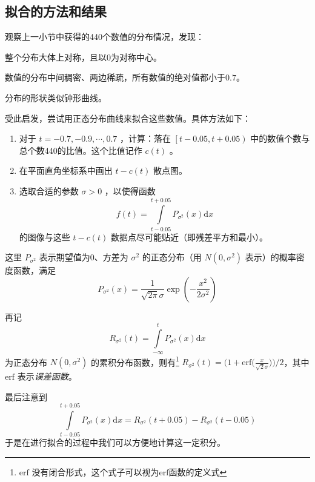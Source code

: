    \subsection{拟合的方法和结果}

        观察上一小节中获得的440个数值的分布情况，发现：
        \begin{asparaitem}
            \item 整个分布大体上对称，且以$0$为对称中心。
            \item 数值的分布中间稠密、两边稀疏，所有数值的绝对值都小于$0.7$。
            \item 分布的形状类似钟形曲线。
        \end{asparaitem}
        
        \vspace{1.5ex}

        受此启发，尝试用正态分布曲线来拟合这些数值。具体方法如下：
        \begin{enumerate}[leftmargin=6em]
            \item [\textbf{步骤 1.}] 对于 $t=-0.7,-0.9,\cdots,0.7$ ，计算：落在 $\left[t-0.05,t+0.05\right)$ 中的数值个数与总个数440的比值。这个比值记作 $c(t)$ 。
            \item [\textbf{步骤 2.}] 在平面直角坐标系中画出 $t-c(t)$ 散点图。
            \item [\textbf{步骤 3.}] 选取合适的参数 $\sigma>0$ ，以使得函数 $$ f(t)=\displaystyle\int\limits_{t-0.05}^{t+0.05} P_{\sigma^2}(x)\mathrm{d} x$$ 的图像与这些 $t-c(t)$ 数据点尽可能贴近（即残差平方和最小）。
        \end{enumerate}

        这里 $P_{\sigma^2}$ 表示期望值为0、方差为 $\sigma^2$ 的正态分布（用 $N(0,\sigma^2)$ 表示）的概率密度函数，满足 $$P_{\sigma^2}(x)=\frac{1}{\sqrt{2\pi}\sigma}\exp{\left(-\frac{x^2}{2\sigma^2}\right)}$$

        再记 $$R_{\sigma^2}(t)=\int\limits_{-\infty}^t P_{\sigma^2}(x)\mathrm{d}x$$ 为正态分布 $N(0,\sigma^2)$ 的累积分布函数，则有\footnote{$\mathrm{erf}$ 没有闭合形式，这个式子可以视为$\mathrm{erf}$函数的定义式} $R_{\sigma^2}(t)=\big(1+\mathrm{erf}\big(\frac x{\sqrt{2}\sigma}\big)\big)/2$\nobreak，其中 $\mathrm{erf}$ 表示\emph{误差函数}。

        最后注意到 $$\int\limits_{t-0.05}^{t+0.05} P_{\sigma^2}(x)\mathrm{d} x=R_{\sigma^2}(t+0.05)-R_{\sigma^2}(t-0.05)$$ 于是在进行拟合的过程中我们可以方便地计算这一定积分。

